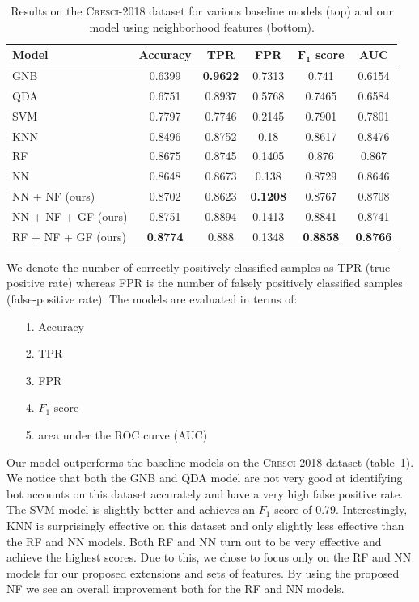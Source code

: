 \begin{table}[t]
\centering
\setlength{\tabcolsep}{12pt}
\begin{tabular}{@{}lccccc@{}}
\toprule
\textbf{Model} & \textbf{Accuracy} & \textbf{TPR} & \textbf{FPR} & \textbf{$\boldsymbol{F_1}$ score} & \textbf{AUC} \\ \midrule
GNB             & 0.6399 & \textbf{0.9622} & 0.7313 & 0.741  & 0.6154 \\
QDA             & 0.6751 & 0.8937 & 0.5768 & 0.7465 & 0.6584 \\
SVM             & 0.7797 & 0.7746 & 0.2145 & 0.7901 & 0.7801 \\
KNN             & 0.8496 & 0.8752 & 0.18   & 0.8617 & 0.8476 \\
RF              & 0.8675 & 0.8745 & 0.1405 & 0.876  & 0.867 \\
NN              & 0.8648 & 0.8673 & 0.138  & 0.8729 & 0.8646 \\ \midrule
NN + NF (ours)  & 0.8702 & 0.8623 & \textbf{0.1208} & 0.8767 & 0.8708 \\
NN + NF + GF (ours) & 0.8751 & 0.8894 & 0.1413 & 0.8841 & 0.8741 \\
RF + NF + GF (ours) & \textbf{0.8774} & 0.888 & 0.1348 & \textbf{0.8858} & \textbf{0.8766} \\
\bottomrule
\end{tabular}
\caption{Results on the \textsc{Cresci-2018} dataset for various baseline models (top) and our model using neighborhood features (bottom).}
\label{tab:results}
\end{table}

\noindent We denote the number of correctly positively classified samples as TPR (true-positive rate) whereas FPR is the number of falsely positively classified samples (false-positive rate). The models are evaluated in terms of:
\begin{itemize}
    \item[1.] Accuracy
    \item[2.] TPR
    \item[3.] FPR
    \item[4.] $F_1$ score
    \item[5.] area under the ROC curve (AUC)
\end{itemize}

Our model outperforms the baseline models on the \textsc{Cresci-2018} dataset (table~\ref{tab:results}). We notice that both the GNB and QDA model are not very good at identifying bot accounts on this dataset accurately and have a very high false positive rate. The SVM model is slightly better and achieves an $F_1$ score of 0.79. Interestingly, KNN is surprisingly effective on this dataset and only slightly less effective than the RF and NN models. Both RF and NN turn out to be very effective and achieve the highest scores. Due to this, we chose to focus only on the RF and NN models for our proposed extensions and sets of features. By using the proposed NF we see an overall improvement both for the RF and NN models.

